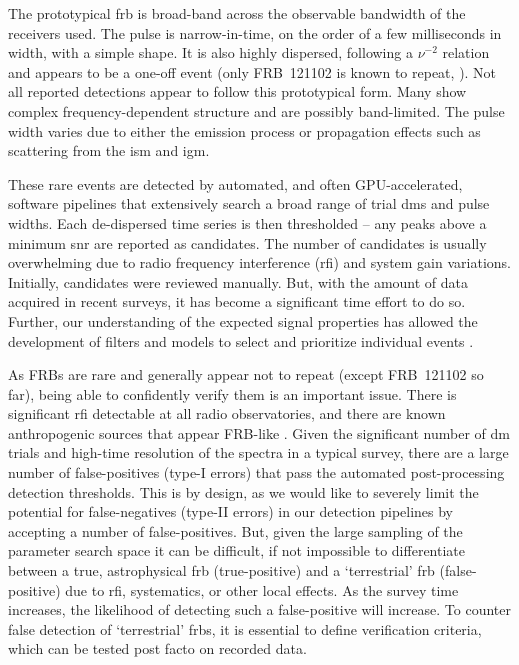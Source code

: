 \documentclass[a4paper,fleqn,usenatbib]{mnras}
\begin{document}
The prototypical \gls{frb} is broad-band across the observable bandwidth of the
receivers used. The pulse is narrow-in-time, on the order of a few milliseconds
in width, with a simple shape. It is also highly dispersed, following a
$\nu^{-2}$ relation and appears to be a one-off event (only FRB~121102 is known
to repeat, \citealt{2016Natur.531..202S}). Not all reported detections appear to
follow this prototypical form. Many show complex frequency-dependent structure
and are possibly band-limited. The pulse width varies due to either the emission
process or propagation effects such as scattering from the \gls{ism} and
\gls{igm}.

These rare events are detected by automated, and often GPU-accelerated, software
pipelines that extensively search a broad range of trial \glspl{dm} and pulse
widths.  Each de-dispersed time series is then thresholded -- any peaks above a
minimum \gls{snr} are reported as candidates. The number of candidates is
usually overwhelming due to radio frequency interference (\gls{rfi}) and system
gain variations. Initially, candidates were reviewed manually. But, with the
amount of data acquired in recent surveys, it has become a significant time
effort to do so. Further, our understanding of the expected signal properties
has allowed the development of filters and models to select and prioritize
individual events \citep[e.g.][]{2018MNRAS.474.3847F}.

As FRBs are rare and generally appear not to repeat (except FRB~121102 so far),
being able to confidently verify them is an important issue. There is
significant \gls{rfi} detectable at all radio observatories, and there are known
anthropogenic sources that appear FRB-like \citep{2011ApJ...727...18B}.  Given
the significant number of \gls{dm} trials and high-time resolution of the
spectra in a typical survey, there are a large number of false-positives (type-I
errors) that pass the automated post-processing detection thresholds.  This is
by design, as we would like to severely limit the potential for false-negatives
(type-II errors) in our detection pipelines by accepting a number of
false-positives.  But, given the large sampling of the parameter search space it
can be difficult, if not impossible to differentiate between a true,
astrophysical \gls{frb} (true-positive) and a `terrestrial' \gls{frb}
(false-positive) due to \gls{rfi}, systematics, or other local effects. As the
survey time increases, the likelihood of detecting such a false-positive will
increase. To counter false detection of `terrestrial' \glspl{frb}, it is
essential to define verification criteria, which can be tested post facto on
recorded data.
\end{document}
